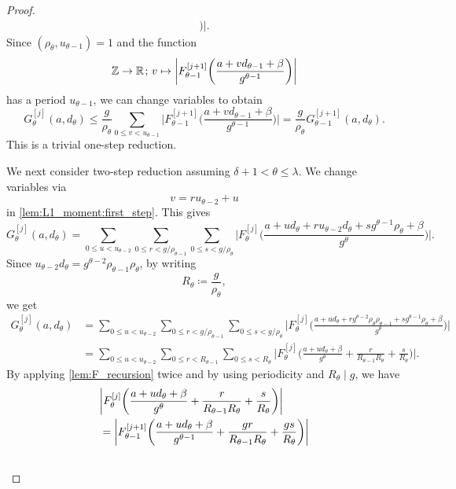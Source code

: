 \documentclass[hidelinks]{amsart}
\numberwithin{equation}{section}
\theoremstyle{plain}
\theoremstyle{definition}
\newcommand{\semicolon}{\nobreak\mskip2mu\mathpunct{}\nonscript
\mkern-\thinmuskip{;}\mskip6muplus1mu\relax}
\begin{document}
\begin{proof}
\begin{align}
\biggr)\biggr|.
\end{align}
Since $(\rho_{\theta},u_{\theta-1})=1$ and the function
\[
\mathbb{Z}\to\mathbb{R}
\semicolon
v
\mapsto
\biggl|F_{\theta-1}^{[j+1]}\biggl(
\frac{a+vd_{\theta-1}+\beta}{g^{\theta-1}}
\biggr)\biggr|
\]
has a period $u_{\theta-1}$, we can change variables to obtain
\begin{equation}
\label{lem:F_L1_moment:one_step}
G_{\theta}^{[j]}(a,d_{\theta})
\le
\frac{g}{\rho_{\theta}}
\sum_{0\le v<u_{\theta-1}}
\biggl|F_{\theta-1}^{[j+1]}\biggl(
\frac{a+vd_{\theta-1}+\beta}{g^{\theta-1}}
\biggr)\biggr|
=
\frac{g}{\rho_{\theta}}
G_{\theta-1}^{[j+1]}(a,d_{\theta}).
\end{equation}
This is a trivial one-step reduction.

We next consider two-step reduction assuming $\delta+1<\theta\le\lambda$.
We change variables via
\[
v=ru_{\theta-2}+u
\]
in \cref{lem:L1_moment:first_step}. This gives
\[
G_{\theta}^{[j]}(a,d_{\theta})
=
\sum_{0\le u<u_{\theta-2}}
\sum_{0\le r<g/\rho_{\theta-1}}
\sum_{0\le s<g/\rho_{\theta}}
\biggl|F_{\theta}^{[j]}\biggl(
\frac{a+ud_{\theta}
+ru_{\theta-2}d_{\theta}
+sg^{\theta-1}\rho_{\theta}
+\beta}{g^{\theta}}
\biggr)\biggr|.
\]
Since $u_{\theta-2}d_{\theta}=g^{\theta-2}\rho_{\theta-1}\rho_{\theta}$,
by writing
\[
R_{\theta}
\coloneqq
\frac{g}{\rho_{\theta}},
\]
we get
\begin{align}
G_{\theta}^{[j]}(a,d_{\theta})
&=
\sum_{0\le u<u_{\theta-2}}
\sum_{0\le r<g/\rho_{\theta-1}}
\sum_{0\le s<g/\rho_{\theta}}
\biggl|F_{\theta}^{[j]}\biggl(
\frac{a+ud_{\theta}
+rg^{\theta-2}\rho_{\theta}\rho_{\theta-1}
+sg^{\theta-1}\rho_{\theta}
+\beta}{g^{\theta}}
\biggr)\biggr|\\
&=
\sum_{0\le u<u_{\theta-2}}
\sum_{0\le r<R_{\theta-1}}
\sum_{0\le s<R_{\theta}}
\biggl|F_{\theta}^{[j]}\biggl(
\frac{a+ud_{\theta}+\beta}{g^{\theta}}
+\frac{r}{R_{\theta-1}R_{\theta}}
+\frac{s}{R_{\theta}}
\biggr)\biggr|.
\end{align}
By applying \cref{lem:F_recursion} twice and by using periodicity and $R_{\theta}\mid g$, we have
\begin{align}
&\biggl|F_{\theta}^{[j]}\biggl(
\frac{a+ud_{\theta}+\beta}{g^{\theta}}
+\frac{r}{R_{\theta-1}R_{\theta}}
+\frac{s}{R_{\theta}}
\biggr)\biggr|\\
&=\biggl|F_{\theta-1}^{[j+1]}\biggl(
\frac{a+ud_{\theta}+\beta}{g^{\theta-1}}
+\frac{gr}{R_{\theta-1}R_{\theta}}
+\frac{gs}{R_{\theta}}
\biggr)\biggr|\\
&\hspace{0.1\textwidth}

\end{align}
\end{proof}
\end{document}
